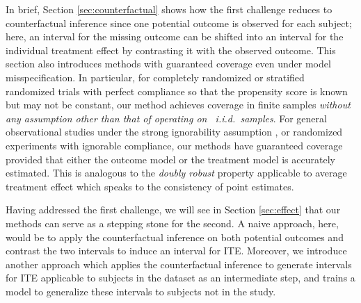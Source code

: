 In brief, Section \ref{sec:counterfactual} shows how the first
challenge reduces to counterfactual inference since one potential
outcome is observed for each subject; here, an interval for the
missing outcome can be shifted into an interval for the individual
treatment effect by contrasting it with the observed outcome.  This
section also introduces methods with guaranteed coverage even under
model misspecification. In particular, for completely randomized or
stratified randomized trials with perfect compliance so that the
propensity score is known but may not be constant, our method
achieves coverage in finite samples \emph{without any assumption other
  than that of operating on ~i.i.d.~samples}. 
For general observational studies under the strong
ignorability assumption \citep{rubin1974estimating}, or randomized
experiments with ignorable compliance, our methods have guaranteed
coverage provided that either the outcome model or the treatment model
is accurately estimated. This is analogous to the \emph{doubly robust}
property applicable to average treatment effect
\citep[e.g.][]{robins1994estimation, kang2007demystifying} which
speaks to the consistency of point
estimates. %

Having addressed the first challenge, we will see in Section
\ref{sec:effect} that our methods can serve as a stepping stone for
the second. A naive approach, here, would be to apply the
counterfactual inference on both potential outcomes and contrast the
two intervals to induce an interval for ITE.
Moreover, we introduce another approach 
which applies the counterfactual inference to generate intervals for ITE
applicable to subjects in the dataset as an intermediate step, and
trains a model to generalize these intervals to subjects not in the
study.

